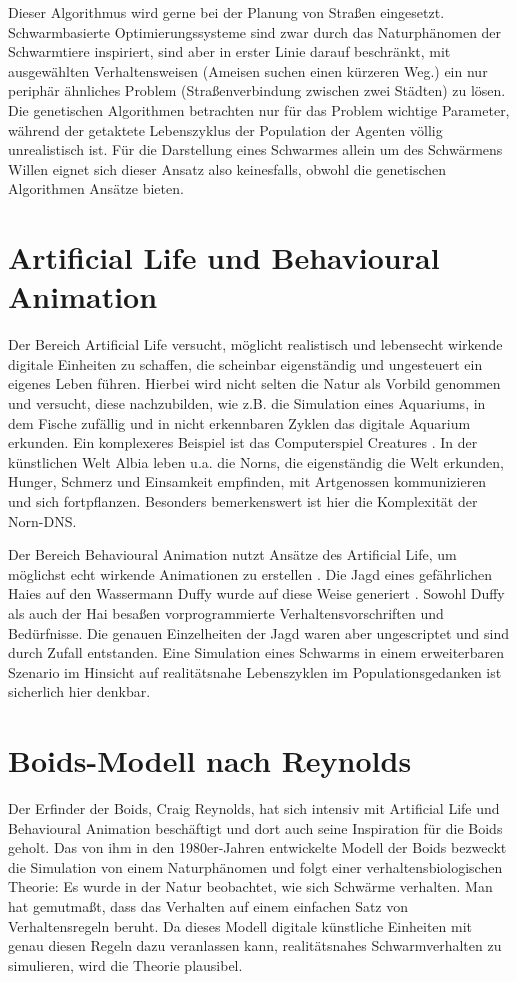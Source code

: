 \documentclass[draft=false
              ,paper=a4
              ,twoside=false
              ,fontsize=11pt
              ,headsepline
              ,BCOR10mm
              ,DIV11
              ,bibtotoc
              ,liststotoc
              ]{scrbook}
\begin{document}
Dieser Algorithmus wird gerne bei der Planung von Straßen eingesetzt. Schwarmbasierte Optimierungssysteme sind zwar durch das Naturphänomen der Schwarmtiere inspiriert, sind aber in erster Linie darauf beschränkt, mit ausgewählten Verhaltensweisen (Ameisen suchen einen kürzeren Weg.) ein nur periphär ähnliches Problem (Straßenverbindung zwischen zwei Städten) zu lösen. Die genetischen Algorithmen betrachten nur für das Problem wichtige Parameter, während der getaktete Lebenszyklus der Population der Agenten völlig unrealistisch ist. Für die Darstellung eines Schwarmes allein um des Schwärmens Willen eignet sich dieser Ansatz also keinesfalls, obwohl die genetischen Algorithmen Ansätze bieten.
\section{Artificial Life und Behavioural Animation}
Der Bereich Artificial Life versucht, möglicht realistisch und lebensecht wirkende digitale Einheiten zu schaffen, die scheinbar eigenständig und ungesteuert ein eigenes Leben führen. Hierbei wird nicht selten die Natur als Vorbild genommen und versucht, diese nachzubilden, wie z.B. die Simulation eines Aquariums, in dem Fische zufällig und in nicht erkennbaren Zyklen das digitale Aquarium erkunden. Ein komplexeres Beispiel ist das Computerspiel Creatures \cite{norns}. In der künstlichen Welt Albia leben u.a. die Norns, die eigenständig die Welt erkunden, Hunger, Schmerz und Einsamkeit empfinden, mit Artgenossen kommunizieren und sich fortpflanzen. Besonders bemerkenswert ist hier die Komplexität der Norn-DNS.

Der Bereich Behavioural Animation nutzt Ansätze des Artificial Life, um möglichst echt wirkende Animationen zu erstellen \cite{reynolds87}. Die Jagd eines gefährlichen Haies auf den Wassermann Duffy wurde auf diese Weise generiert \cite{Funge:1999:CMK:311535.311538}. Sowohl Duffy als auch der Hai besaßen vorprogrammierte Verhaltensvorschriften und Bedürfnisse. Die genauen Einzelheiten der Jagd waren aber ungescriptet und sind durch Zufall entstanden.
Eine Simulation eines Schwarms in einem erweiterbaren Szenario im Hinsicht auf realitätsnahe Lebenszyklen im Populationsgedanken ist sicherlich hier denkbar.
\section{Boids-Modell nach Reynolds}
Der Erfinder der Boids, Craig Reynolds, hat sich intensiv mit Artificial Life und Behavioural Animation beschäftigt und dort auch seine Inspiration für die Boids geholt.
Das von ihm in den 1980er-Jahren entwickelte Modell der Boids \cite{reynolds87}\cite{oai:CiteSeerPSU:509294}\cite{Reynolds:1988:NBI} bezweckt die Simulation von einem Naturphänomen und folgt einer verhaltensbiologischen Theorie: Es wurde in der Natur beobachtet, wie sich Schwärme verhalten. Man hat gemutmaßt, dass das Verhalten auf einem einfachen Satz von Verhaltensregeln beruht. Da dieses Modell digitale künstliche Einheiten mit genau diesen Regeln dazu veranlassen kann, realitätsnahes Schwarmverhalten zu simulieren, wird die Theorie plausibel.
\end{document}
